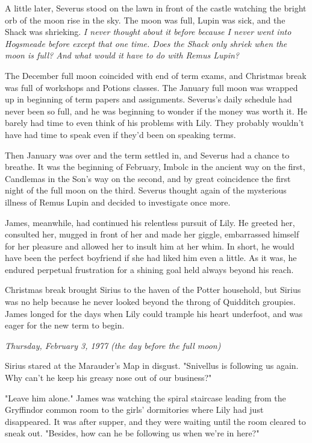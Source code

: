 \documentclass[a4paper,11pt]{article}
\begin{document}
A little later, Severus stood on the lawn in front of the castle watching the bright orb of the moon rise in the sky. The moon was full, Lupin was sick, and the Shack was shrieking. \emph{I never thought about it before because I never went into Hogsmeade before except that one time. Does the Shack only shriek when the moon is full? And what would it have to do with Remus Lupin?}

The December full moon coincided with end of term exams, and Christmas break was full of workshops and Potions classes. The January full moon was wrapped up in beginning of term papers and assignments. Severus's daily schedule had never been so full, and he was beginning to wonder if the money was worth it. He barely had time to even think of his problems with Lily. They probably wouldn't have had time to speak even if they'd been on speaking terms.

Then January was over and the term settled in, and Severus had a chance to breathe. It was the beginning of February, Imbolc in the ancient way on the first, Candlemas in the Son's way on the second, and by great coincidence the first night of the full moon on the third. Severus thought again of the mysterious illness of Remus Lupin and decided to investigate once more.

James, meanwhile, had continued his relentless pursuit of Lily. He greeted her, consulted her, mugged in front of her and made her giggle, embarrassed himself for her pleasure and allowed her to insult him at her whim. In short, he would have been the perfect boyfriend if she had liked him even a little. As it was, he endured perpetual frustration for a shining goal held always beyond his reach.

Christmas break brought Sirius to the haven of the Potter household, but Sirius was no help because he never looked beyond the throng of Quidditch groupies. James longed for the days when Lily could trample his heart underfoot, and was eager for the new term to begin.

\emph{Thursday, February 3, 1977 (the day before the full moon)}

Sirius stared at the Marauder's Map in disgust. "Snivellus is following us again. Why can't he keep his greasy nose out of our business?"

"Leave him alone." James was watching the spiral staircase leading from the Gryffindor common room to the girls' dormitories where Lily had just disappeared. It was after supper, and they were waiting until the room cleared to sneak out. "Besides, how can he be following us when we're in here?"
\end{document}
